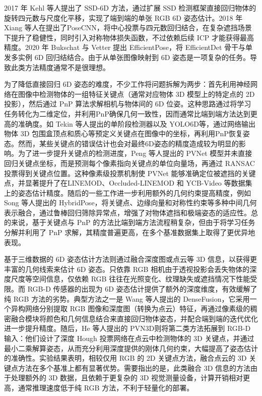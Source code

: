 2017 年 Kehl 等人提出了 SSD-6D 方法\cite{kehl2017ssd}，通过扩展 SSD 检测框架直接回归物体的旋转四元数与尺度化平移，实现了端到端的单张 RGB 6D 姿态估计。2018 年 Xiang 等人在提出了PoseCNN\cite{xiang2018posecnnconvolutionalneuralnetwork}，将中心投票与四元数回归结合，在复杂遮挡场景下提升了稳健性，同时引入对称物体损失函数，不过依赖后续 ICP 才能获得最高精度。2020 年 Bukschat 与 Vetter 提出 EfficientPose\cite{bukschat2020efficientpose}，将 EfficientDet 骨干与单发多实例 6D 回归结结合。由于从单张图像映射到 6D 姿态是一项复杂的任务。导致此类方法精度通常不是很理想。



为了降低直接回归 6D 姿态的难度，不少工作将问题拆解为两步：首先利用神经网络在图像中检测物体的一组特征关键点（通常对应物体 3D 模型上的特定点的 2D 投影），然后通过 PnP 算法求解相机与物体间的 6D 位姿。这种思路通过将学习任务转化为二维定位，并利用PnP确保几何一致性，因而通常比端到端方法达到更高的准确度。如 Tekin 等人提出的单阶段检测器以及 YOLO6D\cite{tekin2018real}等，通过网络输出物体 3D 包围盒顶点和质心等预定义关键点在图像中的坐标，再利用PnP恢复姿态。然而，某些关键点的错误估计也会对最终6D姿态的精度造成较为明显的影响。为了进一步提升关键点的检测进度，Peng 等人提出的 PVNet\cite{peng2019pvnet} 模型并未直接回归关键点坐标，而是预测每个像素指向关键点的单位向量场，再通过 RANSAC 投票得到关键点位置。这种像素级投票机制使 PVNet 能够准确定位被遮挡的关键点，并显著提升了在LINEMOD、Occluded-LINEMOD 和 YCB-Video 等数据集上的姿态估计精度。随后的一些工作进一步利用额外的几何约束提高精度，例如 Song 等人提出的 HybridPose\cite{Song_2020_CVPR}，将关键点、边缘向量和对称性约束等多种中间几何表示融合，通过鲁棒回归筛除异常点，增强了对物体遮挡和极端姿态的适应性。总的来说，基于关键点与 PnP 的方法比端到端方法流程稍复杂，但由于将学习任务分解并利用了 PnP 求解，其精度普遍更高，在多个基准数据集上取得了更优异地表现。


基于三维数据的 6D 姿态估计方法则通过融合深度图或点云等 3D 信息，以获得更丰富的几何线索来估计 6D 姿态。只依靠 RGB 相机由于透视投影会丢失物体的深度尺度等空间信息，仅依赖 RGB 往往在光照变化、纹理缺失或遮挡情况下性能受限。而 RGB-D 传感器的出现为 6D 姿态估计提供了额外的深度维度，有效缓解了纯 RGB 方法的劣势。典型方法之一是 Wang 等人提出的 DenseFusion\cite{wang2019densefusion}，它采用一个异构网络分别提取 RGB 图像和深度图（转换为点云）特征，再通过像素级的稠密融合模块将颜色和几何信息结合来直接回归物体姿态，并配合端到端的迭代优化进一步提升精度。随后，He 等人提出的 PVN3D\cite{he2020pvn3d}则将第二类方法拓展到 RGB-D 输入：他们设计了深度 Hough 投票网络在点云中检测物体的 3D 关键点，并通过最小二乘解算姿态，从而充分利用深度提供的刚体几何约束，大幅提高了姿态估计的准确性。实验结果表明，相较仅用 RGB 的 2D 关键点方法，融合点云的 3D 关键点方法在多个基准上都有显著优势。需要指出的是，此类融合 3D 信息的方法由于处理额外的 3D 数据，且依赖于更复杂的 3D 视觉测量设备，计算开销相对更高，通常推理速度低于纯 RGB 方法，不利于轻量化的部署。



